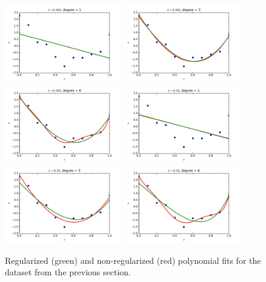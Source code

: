 \documentclass{article}
\begin{document}
\begin{multicols}{2}
\begin{figure}[p] %
   \centering
   \includegraphics[width=2in]{img/3-1_ridge_lambd3_degree1.pdf}
   \includegraphics[width=2in]{img/3-1_ridge_lambd3_degree3.pdf}
   \includegraphics[width=2in]{img/3-1_ridge_lambd3_degree6.pdf}
   \includegraphics[width=2in]{img/3-1_ridge_lambd30_degree1.pdf}
   \includegraphics[width=2in]{img/3-1_ridge_lambd30_degree3.pdf}
   \includegraphics[width=2in]{img/3-1_ridge_lambd30_degree6.pdf}
   \caption{Regularized (green) and non-regularized (red) polynomial fits for the dataset from the previous section.}
   \label{fig:ridge}
\end{figure}


\end{multicols}
\end{document}
